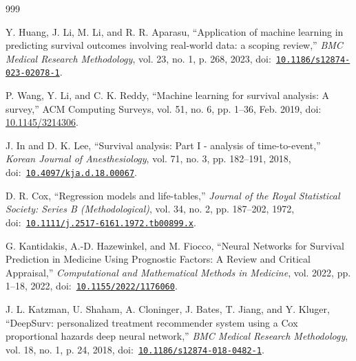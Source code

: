 \begin{thebibliography}{999}
\setlength{\itemsep}{0.35em}

\def\currentbiburl{https://doi.org/10.1186/s12874-023-02078-1}
 Y. Huang, J. Li, M. Li, and R. R. Aparasu, ``Application of machine learning in predicting survival outcomes involving real-world data: a scoping review,'' \emph{BMC Medical Research Methodology}, vol. 23, no. 1, p. 268, 2023, doi:~\href{https://doi.org/10.1186/s12874-023-02078-1}{\nolinkurl{10.1186/s12874-023-02078-1}}.

\def\currentbiburl{https://doi.org/10.1145/3214306}
 P. Wang, Y. Li, and C. K. Reddy, ``Machine learning for survival analysis: A survey,'' ACM Computing Surveys, vol. 51, no. 6, pp. 1--36, Feb. 2019, doi: \href{https://doi.org/10.1145/3214306}{10.1145/3214306}.

\def\currentbiburl{https://doi.org/10.4097/kja.d.18.00067}
 J. In and D. K. Lee, ``Survival analysis: Part I - analysis of time-to-event,'' \emph{Korean Journal of Anesthesiology}, vol. 71, no. 3, pp. 182--191, 2018, doi:~\href{https://doi.org/10.4097/kja.d.18.00067}{\nolinkurl{10.4097/kja.d.18.00067}}.

\def\currentbiburl{https://doi.org/10.1111/j.2517-6161.1972.tb00899.x}
D. R. Cox, ``Regression models and life-tables,'' \emph{Journal of the Royal Statistical Society: Series B (Methodological)}, vol. 34, no. 2, pp. 187--202, 1972, doi:~\href{https://doi.org/10.1111/j.2517-6161.1972.tb00899.x}{\nolinkurl{10.1111/j.2517-6161.1972.tb00899.x}}.

\def\currentbiburl{https://doi.org/10.1155/2022/1176060}
 G. Kantidakis, A.-D. Hazewinkel, and M. Fiocco, ``Neural Networks for Survival Prediction in Medicine Using Prognostic Factors: A Review and Critical Appraisal,'' \emph{Computational and Mathematical Methods in Medicine}, vol. 2022, pp. 1--18, 2022, doi:~\href{https://doi.org/10.1155/2022/1176060}{\nolinkurl{10.1155/2022/1176060}}.

\def\currentbiburl{https://doi.org/10.1186/s12874-018-0482-1}
 J. L. Katzman, U. Shaham, A. Cloninger, J. Bates, T. Jiang, and Y. Kluger, ``DeepSurv: personalized treatment recommender system using a Cox proportional hazards deep neural network,'' \emph{BMC Medical Research Methodology}, vol. 18, no. 1, p. 24, 2018, doi:~\href{https://doi.org/10.1186/s12874-018-0482-1}{\nolinkurl{10.1186/s12874-018-0482-1}}.


\end{thebibliography}
